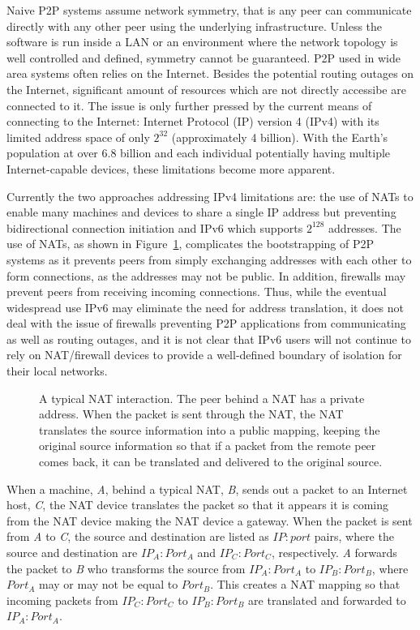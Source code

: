 Naive P2P systems assume network symmetry, that is any peer can communicate
directly with any other peer using the underlying infrastructure.  Unless the
software is run inside a LAN or an environment where the network topology is
well controlled and defined, symmetry cannot be guaranteed.  P2P used in wide
area systems often relies on the Internet.  Besides the potential routing
outages on the Internet, significant amount of resources which are not directly
accessibe are connected to it.  The issue is only further pressed by the
current means of connecting to the Internet: Internet Protocol (IP) version 4
(IPv4) with its limited address space of only $2^{32}$ (approximately 4
billion).  With the Earth's population at over 6.8 billion and each individual
potentially having multiple Internet-capable devices, these limitations become
more apparent.

Currently the two approaches addressing IPv4 limitations are:  the use of
NATs to enable many machines and devices to share a single IP address but
preventing bidirectional connection initiation and IPv6 which supports
$2^{128}$ addresses.  The use of NATs, as shown in Figure~\ref{fig:nat},
complicates the bootstrapping of P2P systems as it prevents peers from simply
exchanging addresses with each other to form connections, as the addresses may
not be public.  In addition, firewalls may prevent peers from receiving
incoming connections.  Thus, while the eventual widespread use IPv6 may
eliminate the need for address translation, it does not deal with the issue of
firewalls preventing P2P applications from communicating as well as routing
outages, and it is not clear that IPv6 users will not continue to rely on
NAT/firewall devices to provide a well-defined boundary of isolation for their
local networks.

\begin{figure}
\centering
{}
\caption[A typical NAT interaction]{A typical NAT interaction. The peer behind
a NAT has a private address.  When the packet is sent through the NAT, the NAT
translates the source information into a public mapping, keeping the original
source information so that if a packet from the remote peer comes back, it can
be translated and delivered to the original source.}
\label{fig:nat}
\end{figure}

When a machine, \textit{A}, behind a typical NAT, \textit{B}, sends out a
packet to an Internet host, \textit{C}, the NAT device translates the packet so
that it appears it is coming from the NAT device making the NAT device a
gateway.  When the packet is sent from \textit{A} to \textit{C}, the source and
destination are listed as $IP:port$ pairs, where the source and destination are
$IP_A:Port_A$ and $IP_C:Port_C$, respectively.  \textit{A} forwards the packet
to \textit{B} who transforms the source from $IP_A:Port_A$ to $IP_B:Port_B$,
where $Port_A$ may or may not be equal to $Port_B$.  This creates a NAT mapping
so that incoming packets from $IP_C:Port_C$ to $IP_B:Port_B$ are translated and
forwarded to $IP_A:Port_A$.

